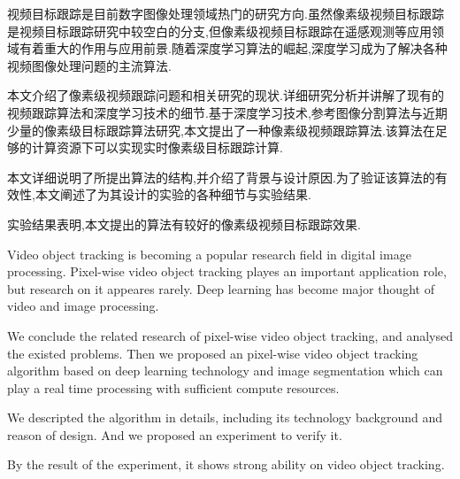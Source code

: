 
\begin{cabstract}
	视频目标跟踪是目前数字图像处理领域热门的研究方向.虽然像素级视频目标跟踪是视频目标跟踪研究中较空白的分支,但像素级视频目标跟踪在遥感观测等应用领域有着重大的作用与应用前景.随着深度学习算法的崛起,深度学习成为了解决各种视频图像处理问题的主流算法.
	\par
	本文介绍了像素级视频跟踪问题和相关研究的现状.详细研究分析并讲解了现有的视频跟踪算法和深度学习技术的细节.基于深度学习技术,参考图像分割算法与近期少量的像素级目标跟踪算法研究,本文提出了一种像素级视频跟踪算法.该算法在足够的计算资源下可以实现实时像素级目标跟踪计算.
	\par
	本文详细说明了所提出算法的结构,并介绍了背景与设计原因.为了验证该算法的有效性,本文阐述了为其设计的实验的各种细节与实验结果.
	\par
	实验结果表明,本文提出的算法有较好的像素级视频目标跟踪效果.
\end{cabstract}

\begin{eabstract}
	Video object tracking is becoming a popular research field in digital image processing. Pixel-wise video object tracking playes an important application role, but research on it appeares rarely. Deep learning has become major thought of video and image processing.
	\par
	We conclude the related research of pixel-wise video object tracking, and analysed the existed problems. Then we proposed an pixel-wise video object tracking algorithm based on deep learning technology and image segmentation which can play a real time processing with sufficient compute resources.
	\par
	We descripted the algorithm in details, including its technology background and reason of design. And we proposed an experiment to verify it.
	\par
	By the result of the experiment, it shows strong ability on video object tracking.
\end{eabstract}

